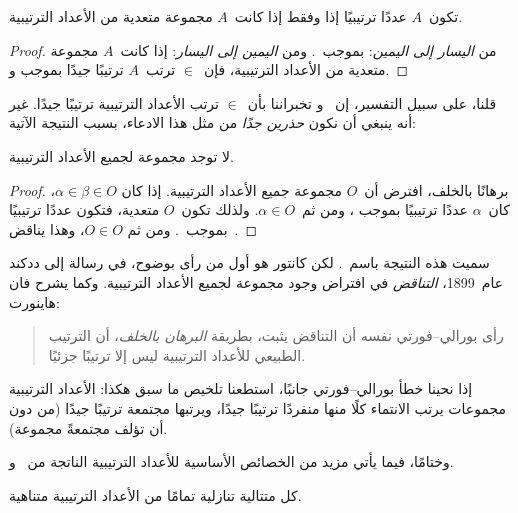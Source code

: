 \documentclass[../../../include/open-logic-section]{subfiles}
\begin{document}
\begin{cor}
تكون~$A$ عددًا ترتيبيًا إذا وفقط إذا كانت~$A$ مجموعة متعدية من الأعداد
الترتيبية.
\end{cor}

\begin{proof}
من \emph{اليسار إلى اليمين}: بموجب~. ومن
\emph{اليمين إلى اليسار}: إذا كانت~$A$ مجموعة متعدية من الأعداد
الترتيبية، فإن~$\in$ ترتب~$A$ ترتيبًا جيدًا بموجب
 و.
\end{proof}

قلنا، على سبيل التفسير، إن~ و
 تخبراننا بأن~$\in$ ترتب الأعداد الترتيبية ترتيبًا
جيدًا. غير أنه ينبغي أن نكون \emph{حذرين جدًا} من مثل هذا الادعاء،
بسبب النتيجة الآتية:

\begin{thm}
لا توجد مجموعة لجميع الأعداد الترتيبية.
\end{thm}

\begin{proof}
برهانًا بالخلف، افترض أن~$O$ مجموعة جميع الأعداد الترتيبية. إذا كان
$\alpha \in \beta \in O$، كان~$\alpha$ عددًا ترتيبيًا بموجب
، ومن ثم~$\alpha \in O$. ولذلك تكون~$O$ متعدية،
فتكون عددًا ترتيبيًا بموجب~. ومن ثم
$O \in O$، وهذا يناقض~.
\end{proof}
\noindent
سميت هذه النتيجة باسم~\citeauthor{Burali-Forti1897}. لكن كانتور هو
أول من رأى بوضوح، في رسالة إلى ددكند عام~1899، \emph{التناقض} في
افتراض وجود مجموعة لجميع الأعداد الترتيبية. وكما يشرح فان هاينورت:
\begin{quote}
  رأى بورالي--فورتي نفسه أن التناقض يثبت، بطريقة \emph{البرهان بالخلف}،
  أن الترتيب الطبيعي للأعداد الترتيبية ليس إلا ترتيبًا جزئيًا.
  \citep[p.~105]{Heijenoort1967}
\end{quote}
إذا نحينا خطأ بورالي--فورتي جانبًا، استطعنا تلخيص ما سبق هكذا: الأعداد
الترتيبية مجموعات يرتب الانتماء كلًا منها منفردًا ترتيبًا جيدًا، ويرتبها
مجتمعة ترتيبًا جيدًا (من دون أن تؤلف مجتمعةً مجموعة).

وختامًا، فيما يأتي مزيد من الخصائص الأساسية للأعداد الترتيبية الناتجة
من~ و.

\begin{prop}
كل متتالية تنازلية تمامًا من الأعداد الترتيبية متناهية.
\end{prop}
\end{document}
